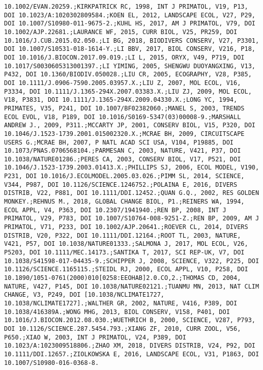 \documentclass[]{article}
\begin{document}
\begin{verbatim}
10.1002/EVAN.20259.;KIRKPATRICK RC, 1998, INT J PRIMATOL, V19, P13, DOI 10.1023/A:1020302809584.;KOEN EL, 2012, LANDSCAPE ECOL, V27, P29, DOI 10.1007/S10980-011-9675-2.;KUHL HS, 2017, AM J PRIMATOL, V79, DOI 10.1002/AJP.22681.;LAURANCE WF, 2015, CURR BIOL, V25, PR259, DOI 10.1016/J.CUB.2015.02.050.;LI BG, 2018, BIODIVERS CONSERV, V27, P3301, DOI 10.1007/S10531-018-1614-Y.;LI BBV, 2017, BIOL CONSERV, V216, P18, DOI 10.1016/J.BIOCON.2017.09.019.;LI L, 2015, ORYX, V49, P719, DOI 10.1017/S0030605313001397.;LI YIMING, 2005, SHENGWU DUOYANGXING, V13, P432, DOI 10.1360/BIODIV.050028.;LIU CR, 2005, ECOGRAPHY, V28, P385, DOI 10.1111/J.0906-7590.2005.03957.X.;LIU Z, 2007, MOL ECOL, V16, P3334, DOI 10.1111/J.1365-294X.2007.03383.X.;LIU ZJ, 2009, MOL ECOL, V18, P3831, DOI 10.1111/J.1365-294X.2009.04330.X.;LONG YC, 1994, PRIMATES, V35, P241, DOI 10.1007/BF02382060.;MANEL S, 2003, TRENDS ECOL EVOL, V18, P189, DOI 10.1016/S0169-5347(03)00008-9.;MARSHALL ANDREW J., 2009, P311.;MCCARTY JP, 2001, CONSERV BIOL, V15, P320, DOI 10.1046/J.1523-1739.2001.015002320.X.;MCRAE BH, 2009, CIRCUITSCAPE USERS G.;MCRAE BH, 2007, P NATL ACAD SCI USA, V104, P19885, DOI 10.1073/PNAS.0706568104.;PARMESAN C, 2003, NATURE, V421, P37, DOI 10.1038/NATURE01286.;PERES CA, 2003, CONSERV BIOL, V17, P521, DOI 10.1046/J.1523-1739.2003.01413.X.;PHILLIPS SJ, 2006, ECOL MODEL, V190, P231, DOI 10.1016/J.ECOLMODEL.2005.03.026.;PIMM SL, 2014, SCIENCE, V344, P987, DOI 10.1126/SCIENCE.1246752.;POLAINA E, 2016, DIVERS DISTRIB, V22, P881, DOI 10.1111/DDI.12452.;QUAN G.Q., 2002, RES GOLDEN MONKEY.;REHNUS M., 2018, GLOBAL CHANGE BIOL, P1.;REINERS WA, 1994, ECOL APPL, V4, P363, DOI 10.2307/1941940.;REN BP, 2008, INT J PRIMATOL, V29, P783, DOI 10.1007/S10764-008-9251-Z.;REN BP, 2009, AM J PRIMATOL, V71, P233, DOI 10.1002/AJP.20641.;ROEVER CL, 2014, DIVERS DISTRIB, V20, P322, DOI 10.1111/DDI.12164.;ROOT TL, 2003, NATURE, V421, P57, DOI 10.1038/NATURE01333.;SALMONA J, 2017, MOL ECOL, V26, P5203, DOI 10.1111/MEC.14173.;SANTIKA T, 2017, SCI REP-UK, V7, DOI 10.1038/S41598-017-04435-9.;SCHIPPER J, 2008, SCIENCE, V322, P225, DOI 10.1126/SCIENCE.1165115.;STEIDL RJ, 2000, ECOL APPL, V10, P258, DOI 10.1890/1051-0761(2000)010[0258:EEOHAB]2.0.CO,2.;THOMAS CD, 2004, NATURE, V427, P145, DOI 10.1038/NATURE02121.;TUANMU MN, 2013, NAT CLIM CHANGE, V3, P249, DOI [10.1038/NCLIMATE1727, 10.1038/NCLIMATE1727].;WALTHER GR, 2002, NATURE, V416, P389, DOI 10.1038/416389A.;WONG MHG, 2013, BIOL CONSERV, V158, P401, DOI 10.1016/J.BIOCON.2012.08.030.;WUETHRICH B, 2000, SCIENCE, V287, P793, DOI 10.1126/SCIENCE.287.5454.793.;XIANG ZF, 2010, CURR ZOOL, V56, P650.;XIAO W, 2003, INT J PRIMATOL, V24, P389, DOI 10.1023/A:1023009518806.;ZHAO XM, 2018, DIVERS DISTRIB, V24, P92, DOI 10.1111/DDI.12657.;ZIOLKOWSKA E, 2016, LANDSCAPE ECOL, V31, P1863, DOI 10.1007/S10980-016-0368-8.

\end{verbatim}
\end{document}
